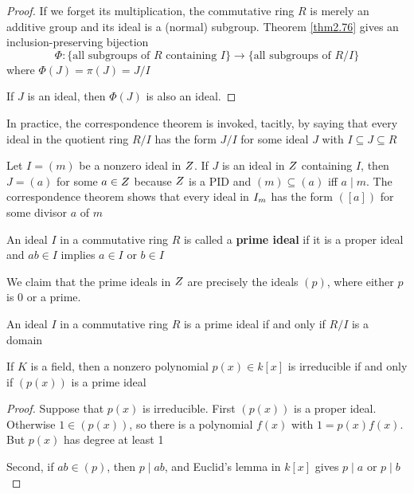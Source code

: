 \documentclass[11pt]{article}
\begin{document}
\begin{proof}
If we forget its multiplication, the commutative ring \(R\) is merely an
additive group and its ideal is a (normal) subgroup. Theorem \ref{thm2.76}
gives an inclusion-preserving bijection
\begin{equation*}
\Phi:\{\text{all subgroups of $R$ containing $I$}\}\to 
\{\text{all subgroups of $R/I$}\}
\end{equation*}
where \(\Phi(J)=\pi(J)=J/I\)

If \(J\) is an ideal, then \(\Phi(J)\) is also an ideal.
\end{proof}

In practice, the correspondence theorem is invoked, tacitly, by saying that
every ideal in the quotient ring \(R/I\) has the form \(J/I\) for some ideal
\(J\) with \(I\subseteq J\subseteq R\)

\begin{examplle}[]
Let \(I=(m)\) be a nonzero ideal in \(\relax{Z}\). If \(J\) is an ideal in \(\relax{Z}\)
containing \(I\), then \(J=(a)\) for some \(a\in\relax{Z}\) because \(\relax{Z}\) is a PID
and \((m)\subseteq(a)\) iff \(a\mid m\). The correspondence theorem shows
that every ideal in \(\relax{I}_m\) has the form \(([a])\) for some divisor \(a\) of \(m\)
\end{examplle}

\begin{definition}[]
An ideal \(I\) in a commutative ring \(R\) is called a \textbf{prime ideal} if it is a
proper ideal and \(ab\in I\) implies \(a\in I\) or \(b\in I\)
\end{definition}

\begin{examplle}[]
We claim that the prime ideals in \(\relax{Z}\) are precisely the ideals \((p)\),
where either \(p\) is 0 or a prime.
\end{examplle}

\begin{proposition}[]
An ideal \(I\) in a commutative ring \(R\) is a prime ideal if and only if
\(R/I\) is a domain
\end{proposition}

\begin{proposition}[]
If \(K\) is a field, then a nonzero polynomial \(p(x)\in k[x]\) is irreducible
if and only if \((p(x))\) is a prime ideal
\end{proposition}

\begin{proof}
Suppose that \(p(x)\) is irreducible. First \((p(x))\) is a proper ideal.
Otherwise \(1\in (p(x))\), so there is a polynomial \(f(x)\) with
\(1=p(x)f(x)\). But \(p(x)\) has degree at least 1

Second, if \(ab\in(p)\), then \(p\mid ab\), and Euclid's lemma in \(k[x]\)
gives \(p\mid a\) or \(p\mid b\)
\end{proof}
\end{document}

